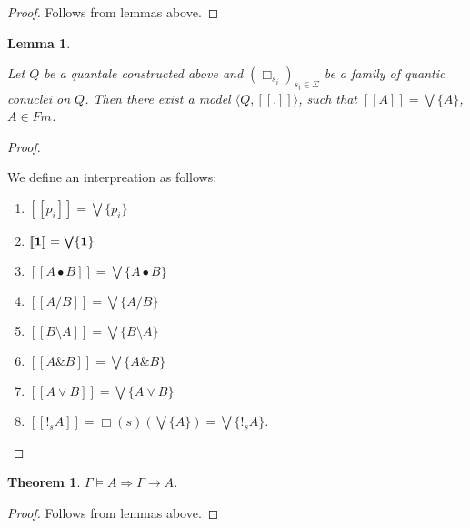 \documentclass[a4paper]{article}
\theoremstyle{defin}
\theoremstyle{theorem}
\newtheorem{theorem}{Theorem}
\theoremstyle{prop}
\theoremstyle{lemma}
\newtheorem{lemma}{Lemma}
\theoremstyle{ex}
\theoremstyle{col}
\begin{document}
\begin{proof}
  Follows from lemmas above.
\end{proof}

\begin{lemma}
$ $

  Let $Q$ be a quantale constructed above and $(\Box_{s_i})_{s_i \in \Sigma}$ be a family of quantic conuclei on $Q$.
  Then there exist a model $\langle Q, [\![.]\!]\rangle$, such that $[\![A]\!] = \bigvee \{ A \}$, $A \in Fm$.
\end{lemma}

\begin{proof}
$ $

  We define an interpreation as follows:

\begin{enumerate}
  \item $[\![p_i]\!] = \bigvee \{ p_i \}$
  \item $[\![{\bf 1}]\!] = \bigvee \{ {\bf 1} \}$
  \item $[\![A \bullet B]\!] = \bigvee \{ A \bullet B \}$
  \item $[\![A / B]\!] = \bigvee \{ A / B \}$
  \item $[\![B \setminus A]\!] = \bigvee \{ B \setminus A \}$
  \item $[\![A \& B ]\!] = \bigvee \{ A \& B \}$
  \item $[\![A \lor B]\!] = \bigvee \{ A \lor B\}$
  \item $[\![!_s A]\!] = \Box(s) (\bigvee \{ A \}) = \bigvee \{ !_s A \}$.
\end{enumerate}
\end{proof}

\begin{theorem}
  $\Gamma \models A \Rightarrow \Gamma \rightarrow A$.
\end{theorem}

\begin{proof}
  Follows from lemmas above.
\end{proof}
\end{document}
